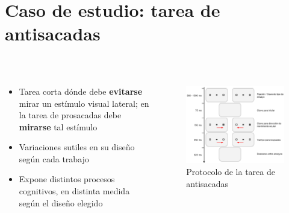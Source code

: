 \documentclass[aspectratio=169]{beamer}
\begin{document}
\section{Caso de estudio: tarea de antisacadas}

\begin{frame}{~}

  \begin{columns}
  \begin{column}{.5\textwidth}
    \begin{itemize}
      \item Tarea corta dónde debe \textbf{evitarse} mirar un estímulo visual lateral; en la tarea de prosacadas debe \textbf{mirarse} tal estímulo

      \item Variaciones sutiles en su diseño según cada trabajo

      \item Expone distintos procesos cognitivos, en distinta medida según el diseño elegido
    \end{itemize}
  \end{column}
  \begin{column}{.5\textwidth}
    \begin{figure}
      \centering
      \includegraphics[width=\linewidth]{img/antisaccades-protocol.png}
      \caption{Protocolo de la tarea de antisacadas}
    \end{figure}
  \end{column}
  \end{columns}

\end{frame}
\end{document}
